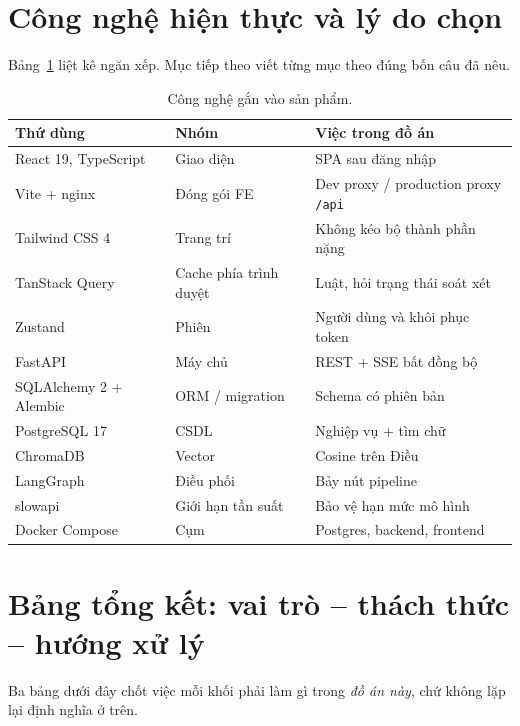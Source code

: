 \section{Công nghệ hiện thực và lý do chọn}

Bảng~\ref{tab:cong-nghe} liệt kê ngăn xếp. Mục tiếp theo viết từng mục theo đúng
bốn câu đã nêu.

\begin{table}[htp]
\centering
\caption{Công nghệ gắn vào sản phẩm.}
\label{tab:cong-nghe}
\begin{tabular}{p{3.4cm}p{3.8cm}p{6.6cm}}
\toprule
\textbf{Thứ dùng} & \textbf{Nhóm} & \textbf{Việc trong đồ án} \\
\midrule
React 19, TypeScript & Giao diện & SPA sau đăng nhập \\
Vite + nginx & Đóng gói FE & Dev proxy / production proxy \texttt{/api} \\
Tailwind CSS 4 & Trang trí & Không kéo bộ thành phần nặng \\
TanStack Query & Cache phía trình duyệt & Luật, hỏi trạng thái soát xét \\
Zustand & Phiên & Người dùng và khôi phục token \\
FastAPI & Máy chủ & REST + SSE bất đồng bộ \\
SQLAlchemy 2 + Alembic & ORM / migration & Schema có phiên bản \\
PostgreSQL 17 & CSDL & Nghiệp vụ + tìm chữ \\
ChromaDB & Vector & Cosine trên Điều \\
LangGraph & Điều phối & Bảy nút pipeline \\
slowapi & Giới hạn tần suất & Bảo vệ hạn mức mô hình \\
Docker Compose & Cụm & Postgres, backend, frontend \\
\bottomrule
\end{tabular}
\end{table}





\section{Bảng tổng kết: vai trò -- thách thức -- hướng xử lý}

Ba bảng dưới đây chốt việc mỗi khối phải làm gì trong \emph{đồ án này}, chứ
không lặp lại định nghĩa ở trên.

